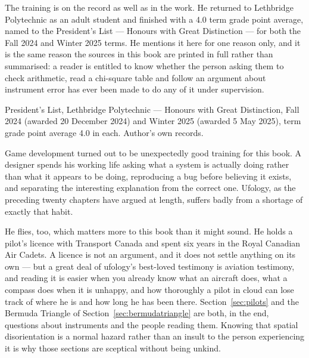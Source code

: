 \vspace{4pt}\par
\noindent The training is on the record as well as in the work. He returned to Lethbridge
Polytechnic as an adult student and finished with a 4.0 term grade point average, named to the
President's List --- Honours with Great Distinction --- for both the Fall 2024 and Winter 2025
terms. He mentions it here for one reason only, and it is the same reason the sources in this book
are printed in full rather than summarised: a reader is entitled to know whether the person asking
them to check arithmetic, read a chi-square table and follow an argument about instrument error has
ever been made to do any of it under supervision.

\vspace{6pt}\par
\Needspace*{4.6in}
\begin{center}
\par\vspace{6pt}
\end{center}
\vspace{3pt}\par
\noindent\begin{minipage}{\linewidth}
{\RaggedRight\scriptsize\color{steel} President's List, Lethbridge Polytechnic --- Honours with
Great Distinction, Fall 2024 (awarded 20 December 2024) and Winter 2025 (awarded 5 May 2025), term
grade point average 4.0 in each. Author's own records.\par}
\end{minipage}\par\vspace{13pt}

\noindent Game development turned out to be unexpectedly good training for this book. A designer spends his
working life asking what a system is actually doing rather than what it appears to be doing,
reproducing a bug before believing it exists, and separating the interesting explanation from the
correct one. Ufology, as the preceding twenty chapters have argued at length, suffers badly from a
shortage of exactly that habit.

He flies, too, which matters more to this book than it might sound. He holds a pilot's licence with
Transport Canada and spent six years in the Royal Canadian Air Cadets. A licence is
not an argument, and it does not settle anything on its own --- but a great deal of ufology's
best-loved testimony is aviation testimony, and reading it is easier when you already know what an
aircraft does, what a compass does when it is unhappy, and how thoroughly a pilot in cloud can lose
track of where he is and how long he has been there. Section~\ref{sec:pilots} and the Bermuda
Triangle of Section~\ref{sec:bermudatriangle} are both, in the end, questions about instruments and
the people reading them. Knowing that spatial disorientation is a normal hazard rather than an
insult to the person experiencing it is why those sections are sceptical without being
unkind.

